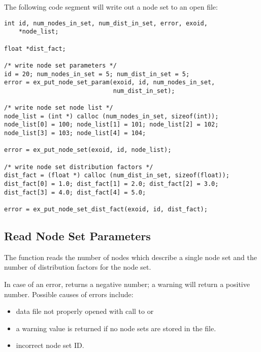 The following code segment will write out a node set to an open \exo{}
file:

\begin{lstlisting}
int id, num_nodes_in_set, num_dist_in_set, error, exoid, 
    *node_list;

float *dist_fact;

/* write node set parameters */
id = 20; num_nodes_in_set = 5; num_dist_in_set = 5;
error = ex_put_node_set_param(exoid, id, num_nodes_in_set, 
                              num_dist_in_set);

/* write node set node list */
node_list = (int *) calloc (num_nodes_in_set, sizeof(int));
node_list[0] = 100; node_list[1] = 101; node_list[2] = 102;
node_list[3] = 103; node_list[4] = 104;

error = ex_put_node_set(exoid, id, node_list);

/* write node set distribution factors */
dist_fact = (float *) calloc (num_dist_in_set, sizeof(float));
dist_fact[0] = 1.0; dist_fact[1] = 2.0; dist_fact[2] = 3.0;
dist_fact[3] = 4.0; dist_fact[4] = 5.0;

error = ex_put_node_set_dist_fact(exoid, id, dist_fact);
\end{lstlisting}

\subsection{Read Node Set Parameters}

The function  reads the number of
nodes which describe a single node set and the number of distribution
factors for the node set.

In case of an error,  returns a
negative number; a warning will return a positive number. Possible
causes of errors include:

\begin{itemize}
 \item data file not properly opened with call to 
 or 

 \item a warning value is returned if no node sets are stored 
in the file.

 \item incorrect node set ID.
\end{itemize}


